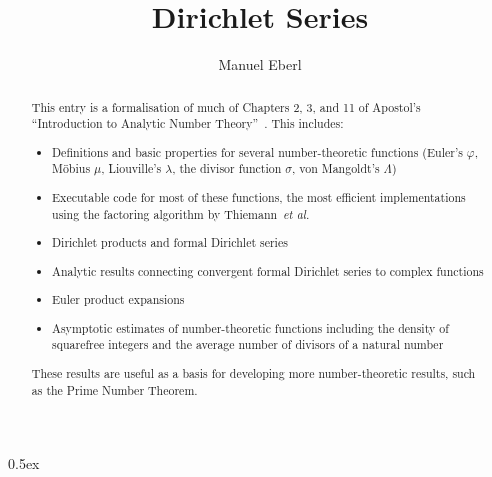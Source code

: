 \documentclass[11pt,a4paper]{article}
\begin{document}
\title{Dirichlet Series}
\author{Manuel Eberl}
\maketitle

\begin{abstract}
This entry is a formalisation of much of Chapters 2, 3, and 11 of Apostol's ``Introduction to Analytic Number Theory''~\cite{apostol}. This includes:
\begin{itemize} 
	\item Definitions and basic properties for several number-theoretic functions (Euler's $\varphi$, M\"{o}bius $\mu$, Liouville's $\lambda$, the divisor function $\sigma$, von Mangoldt's $\Lambda$)
\item Executable code for most of these functions, the most efficient implementations using the factoring algorithm by Thiemann\ \emph{et al.}
\item Dirichlet products and formal Dirichlet series
\item Analytic results connecting convergent formal Dirichlet series to complex functions
\item Euler product expansions
\item Asymptotic estimates of number-theoretic functions including the density of squarefree integers and the average number of divisors of a natural number
\end{itemize}
These results are useful as a basis for developing more number-theoretic results, such as the Prime Number Theorem.
\end{abstract}

\newpage
\tableofcontents
\newpage
\parindent 0pt\parskip 0.5ex





\end{document}
